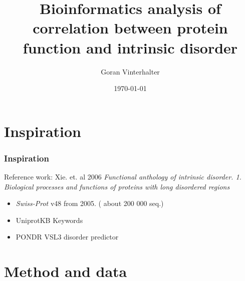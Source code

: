 \documentclass{beamer}
\title[Protein function and IDP \& IDPr]{ Bioinformatics analysis
of correlation between protein function and intrinsic disorder}
\author{Goran Vinterhalter}
\institute[Faculty of Mathematics]{University of Belgrade Faculty of Mathematics}
\date{\today}
\newcommand{\swissprot}{\textit{Swiss-Prot} }
\begin{document}


\begin{frame}
  \titlepage
\end{frame}

\begin{frame}
\tableofcontents[]
\end{frame}


\section{Inspiration}
\begin{frame}
  \frametitle{Inspiration}

  \begin{block} {Reference work: Xie. et. al 2006}
    \textit{Functional anthology of intrinsic disorder. 1.\\
  \footnotesize Biological processes and functions of proteins with long disordered regions}
  \end{block}

  \pause
  \begin{itemize}
    \item \swissprot v48 from 2005. ( about 200 000 seq.)
      \pause
    \item UniprotKB Keywords
      \pause

    \item PONDR VSL3 disorder predictor
  \end{itemize}

\end{frame}


\section{Method and data}
\end{document}
